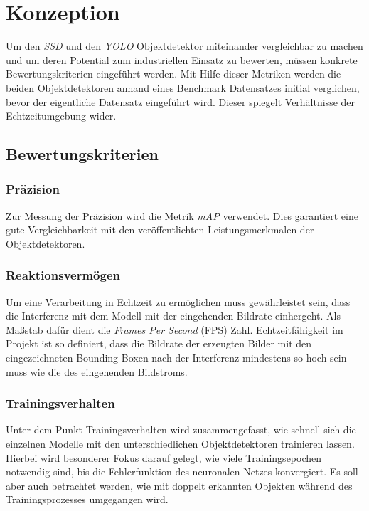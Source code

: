 \chapter{Konzeption}

Um den \textit{SSD} und den \textit{YOLO} Objektdetektor miteinander vergleichbar zu machen und um deren Potential zum industriellen Einsatz zu bewerten, müssen konkrete Bewertungskriterien eingeführt werden. Mit Hilfe dieser Metriken werden die beiden Objektdetektoren anhand eines Benchmark Datensatzes initial verglichen, bevor der eigentliche Datensatz eingeführt wird. Dieser spiegelt Verhältnisse der Echtzeitumgebung wider. 

\section{Bewertungskriterien}

\subsection*{Präzision}

Zur Messung der Präzision wird die Metrik \textit{mAP} verwendet. Dies garantiert eine gute Vergleichbarkeit mit den veröffentlichten Leistungsmerkmalen der Objektdetektoren.

\subsection*{Reaktionsvermögen}

Um eine Verarbeitung in Echtzeit zu ermöglichen muss gewährleistet sein, dass die Interferenz mit dem Modell mit der eingehenden Bildrate einhergeht. Als Maßstab dafür dient die \textit{Frames Per Second} (FPS) Zahl. Echtzeitfähigkeit im Projekt ist so definiert, dass die Bildrate der erzeugten Bilder mit den eingezeichneten Bounding Boxen nach der Interferenz mindestens so hoch sein muss wie die des eingehenden Bildstroms. 

\subsection*{Trainingsverhalten}

Unter dem Punkt Trainingsverhalten wird zusammengefasst, wie schnell sich die einzelnen Modelle mit den unterschiedlichen Objektdetektoren trainieren lassen. Hierbei wird besonderer Fokus darauf gelegt, wie viele Trainingsepochen notwendig sind, bis die Fehlerfunktion des neuronalen Netzes konvergiert. Es soll aber auch betrachtet werden, wie mit doppelt erkannten Objekten während des Trainingsprozesses umgegangen wird. 


